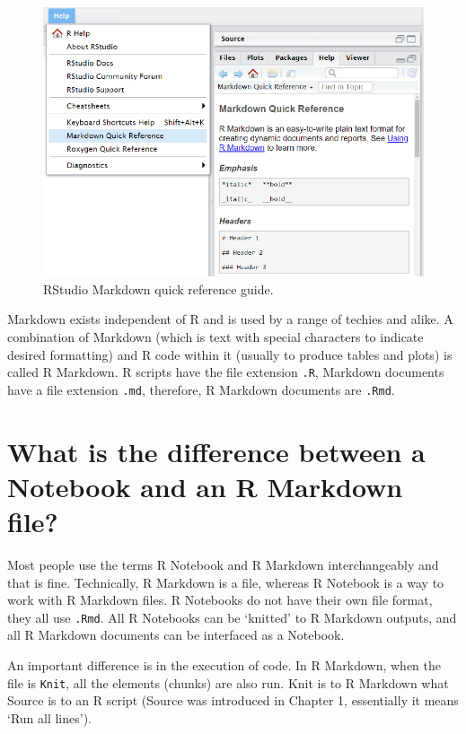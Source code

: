 \documentclass[
  12pt,
  krantz2]{krantz}
\begin{document}
\begin{figure}
\centering
\includegraphics{images/chapter12/3_help.pdf}
\caption{\label{fig:chap12-fig-help}RStudio Markdown quick reference guide.}
\end{figure}

Markdown exists independent of R and is used by a range of techies and alike.
A combination of Markdown (which is text with special characters to indicate desired formatting) and R code within it (usually to produce tables and plots) is called R Markdown.
R scripts have the file extension \texttt{.R}, Markdown documents have a file extension \texttt{.md}, therefore, R Markdown documents are \texttt{.Rmd}.

\hypertarget{what-is-the-difference-between-a-notebook-and-an-r-markdown-file}{%
\section{What is the difference between a Notebook and an R Markdown file?}\label{what-is-the-difference-between-a-notebook-and-an-r-markdown-file}}

Most people use the terms R Notebook and R Markdown interchangeably and that is fine.
Technically, R Markdown is a file, whereas R Notebook is a way to work with R Markdown files.
R Notebooks do not have their own file format, they all use \texttt{.Rmd}.
All R Notebooks can be `knitted' to R Markdown outputs, and all R Markdown documents can be interfaced as a Notebook.

An important difference is in the execution of code.
In R Markdown, when the file is \texttt{Knit}, all the elements (chunks) are also run.
Knit is to R Markdown what Source is to an R script (Source was introduced in Chapter 1, essentially it means `Run all lines').
\end{document}
